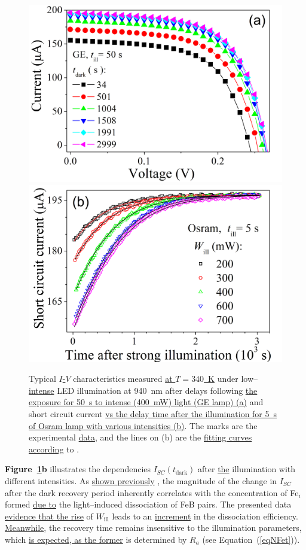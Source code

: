 \documentclass{WileyMSP-template}
\begin{document}
\begin{figure}
\centering
  \includegraphics[width=0.4\linewidth]{Fig2a.png}
  \includegraphics[width=0.4\linewidth]{Fig2b.png}
  \caption{Typical \textcolor[rgb]{0.00,0.07,1.00}{\uline{$I$-$V$}} characteristics measured \textcolor[rgb]{0.00,0.07,1.00}{\uline{at $T=340$~K}}
  under low--\textcolor[rgb]{0.00,0.07,1.00}{\uline{intense}} LED illumination at 940~nm after delays following 
  \textcolor[rgb]{0.00,0.07,1.00}{\uline{the exposure for 50~s to intense (400~mW) light (GE lamp) (a)}} and
  short circuit current \textcolor[rgb]{0.00,0.07,1.00}{\uline{vs the delay time after the illumination for 5~s of Osram lamp with various intensities (b)}}.
  The marks are the experimental \textcolor[rgb]{0.00,0.07,1.00}{\uline{data}}, and the lines on (b) are the 
  \textcolor[rgb]{0.00,0.07,1.00}{\uline{fitting curves according}} to \cite{Olikh2022:JMatSci,Olikh2021JAP}.
  }
  \label{fig2}
\end{figure}

\textbf{Figure~\ref{fig2}b} illustrates the dependencies $I_{SC}(t_\mathrm{dark})$ after \textcolor[rgb]{0.00,0.07,1.00}{\uline{the}} illumination with different intensities.
As \textcolor[rgb]{0.00,0.07,1.00}{\uline{shown previously}} \cite{Olikh2021JAP}, the magnitude of the change in $I_{SC}$ after the dark recovery period
inherently correlates with the concentration of Fe$_i$ formed \textcolor[rgb]{0.00,0.07,1.00}{\uline{due to}} the light--induced dissociation of FeB pairs.
The presented data \textcolor[rgb]{0.00,0.07,1.00}{\uline{evidence that the rise}} of $W_\mathrm{ill}$ leads to an \textcolor[rgb]{0.00,0.07,1.00}{\uline{increment}} in the dissociation efficiency.
\textcolor[rgb]{0.00,0.07,1.00}{\uline{Meanwhile}}, the recovery time remains insensitive to the illumination parameters, which 
\textcolor[rgb]{0.00,0.07,1.00}{\uline{is expected, as the former}} is determined by $R_a$ (see Equation~(\ref{eqNFet})).
\end{document}
